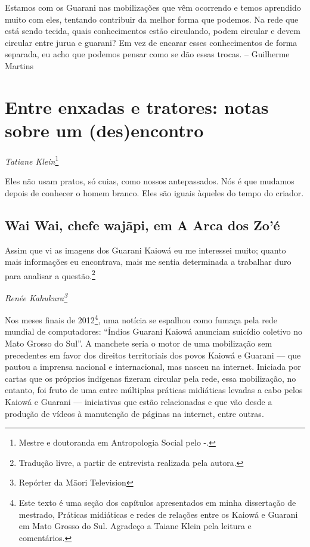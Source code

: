 {{Estamos com os Guarani nas mobilizações que vêm ocorrendo e temos
aprendido muito com eles, tentando contribuir da melhor forma que
podemos. Na rede que está sendo tecida, quais conhecimentos estão
circulando, podem circular e devem circular entre jurua e guarani? Em
vez de encarar esses conhecimentos de forma separada, eu acho que
podemos pensar como se dão essas trocas. – Guilherme Martins

\chapter{Entre enxadas e tratores: notas sobre um (des)encontro}
\begin{flushright}
\emph{Tatiane Klein}\footnote{Mestre e doutoranda em Antropologia Social pelo
-.}
\end{flushright}
\medskip

Eles não usam pratos, só cuias, como nossos antepassados. Nós é que
mudamos depois de conhecer o homem branco. Eles são iguais àqueles do
tempo do criador.

\section{Wai Wai, chefe wajãpi, em A Arca dos Zo’é}

Assim que vi as imagens dos Guarani Kaiowá eu me interessei muito;
quanto mais informações eu encontrava, mais me sentia determinada a
trabalhar duro para analisar a questão.\footnote{Tradução livre, a
partir de entrevista realizada pela autora.}

\begin{flushright}
\emph{Renée Kahukura\footnote{Repórter da M\=aori Television}}
\end{flushright}

Nos meses finais de 2012\footnote{Este texto é uma seção dos capítulos
apresentados em minha dissertação de mestrado, Práticas midiáticas e
redes de relações entre os Kaiowá e Guarani em Mato Grosso do Sul.
Agradeço a Taiane Klein pela leitura e comentários.}, uma notícia se
espalhou como fumaça pela rede mundial de computadores: ``Índios Guarani
Kaiowá anunciam suicídio coletivo no Mato Grosso do Sul''. A manchete
seria o motor de uma mobilização sem precedentes em favor dos direitos
territoriais dos povos Kaiowá e Guarani --- que pautou a imprensa
nacional e internacional, mas nasceu na internet. Iniciada por cartas
que os próprios indígenas fizeram circular pela rede, essa mobilização,
no entanto, foi fruto de uma entre múltiplas práticas midiáticas
levadas a cabo pelos Kaiowá e Guarani --- iniciativas que estão
relacionadas e que vão desde a produção de vídeos à manutenção de
páginas na internet, entre outras. 

}}
